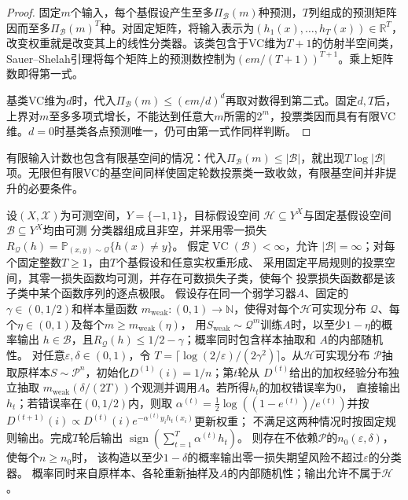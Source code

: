 \begin{proof}
固定$m$个输入，每个基假设产生至多$\Pi_{\mathcal B}(m)$种预测，$T$列组成的预测矩阵因而至多$\Pi_{\mathcal B}(m)^T$种。对固定矩阵，将输入表示为$(h_1(x),\ldots,h_T(x))\in\mathbb R^T$，改变权重就是改变其上的线性分类器。该类包含于VC维为$T+1$的仿射半空间类，Sauer--Shelah引理将每个矩阵上的预测数控制为$(em/(T+1))^{T+1}$。乘上矩阵数即得第一式。

基类VC维为$d$时，代入$\Pi_{\mathcal B}(m)\leq(em/d)^d$再取对数得到第二式。固定$d,T$后，上界对$m$至多多项式增长，不能达到任意大$m$所需的$2^m$，投票类因而具有有限VC维。$d=0$时基类各点预测唯一，仍可由第一式作同样判断。
\end{proof}

有限输入计数也包含有限基空间的情况：代入$\Pi_{\mathcal B}(m)\leq|\mathcal B|$，就出现$T\log|\mathcal B|$项。无限但有限VC的基空间同样使固定轮数投票类一致收敛，有限基空间并非提升的必要条件。

\begin{theorem}[有限VC维基假设空间下的弱学习提升]
\label{thm:finite-class-boosting}
\label{thm:finite-vc-boosting}
设$(X,\mathcal X)$为可测空间，$Y=\{-1,1\}$，目标假设空间
$\mathcal H\subseteq Y^X$与固定基假设空间$\mathcal B\subseteq Y^X$均由可测
分类器组成且非空，并采用零一损失
$R_{\mathcal Q}(h)=\mathbb P_{(x,y)\sim\mathcal Q}\{h(x)\neq y\}$。
假定$\operatorname{VC}(\mathcal B)<\infty$，允许
$|\mathcal B|=\infty$；对每个固定整数$T\geq1$，由$T$个基假设和任意实权重形成、
采用固定平局规则的投票空间，其零一损失函数均可测，并存在可数损失子类，使每个
投票损失函数都是该子类中某个函数序列的逐点极限。
假设存在同一个弱学习器$A$、固定的$\gamma\in(0,1/2)$和样本量函数
$m_{\mathrm{weak}}:(0,1)\to\mathbb N$，使得对每个$\mathcal H$可实现分布
$\mathcal Q$、每个$\eta\in(0,1)$及每个$m\geq m_{\mathrm{weak}}(\eta)$，
用$S_{\mathrm{weak}}\sim\mathcal Q^m$训练$A$时，以至少$1-\eta$的概率输出
$h\in\mathcal B$，且$R_{\mathcal Q}(h)\leq1/2-\gamma$；概率同时包含样本抽取和
$A$的内部随机性。
对任意$\varepsilon,\delta\in(0,1)$，令
$T=\lceil\log(2/\varepsilon)/(2\gamma^2)\rceil$。从$\mathcal H$可实现分布
$\mathcal P$抽取原样本$S\sim\mathcal P^n$，初始化$D^{(1)}(i)=1/n$；第$t$轮从
$D^{(t)}$给出的加权经验分布独立抽取
$m_{\mathrm{weak}}(\delta/(2T))$个观测并调用$A$。若所得$h_t$的加权错误率为0，
直接输出$h_t$；若错误率在$(0,1/2)$内，则取
$\alpha^{(t)}=\tfrac12\log((1-e^{(t)})/e^{(t)})$并按
$D^{(t+1)}(i)\propto D^{(t)}(i)e^{-\alpha^{(t)}y_i h_t(x_i)}$更新权重；
不满足这两种情况时按固定规则输出。完成$T$轮后输出
$\operatorname{sign}(\sum_{t=1}^T\alpha^{(t)}h_t)$。
则存在不依赖$\mathcal P$的$n_0(\varepsilon,\delta)$，使每个$n\geq n_0$时，
该构造以至少$1-\delta$的概率输出零一损失期望风险不超过$\varepsilon$的分类器。
概率同时来自原样本、各轮重新抽样及$A$的内部随机性；输出允许不属于$\mathcal H$。
\end{theorem}

